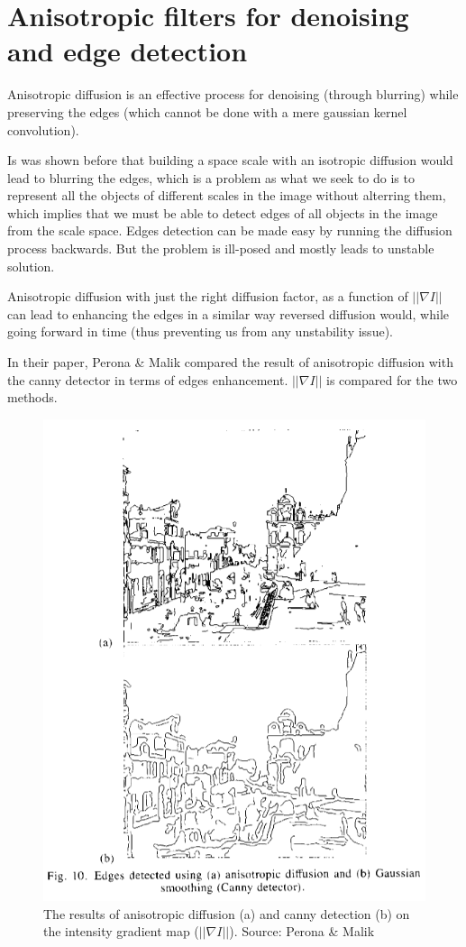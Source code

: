 \documentclass[12pt,a4paper]{article}
\begin{document}
\section{Anisotropic filters for denoising and edge detection}

Anisotropic diffusion is an effective process for denoising (through blurring) while preserving the edges (which cannot be done with a mere gaussian kernel convolution). 

Is was shown before that building a space scale with an isotropic diffusion would lead to blurring the edges, which is a problem as what we seek to do is to represent all the objects of different scales in the image without alterring them, which implies that we must be able to detect edges of all objects in the image from the scale space.
Edges detection can be made easy by running the diffusion process backwards. But the problem is ill-posed and mostly leads to unstable solution.

Anisotropic diffusion with just the right diffusion factor, as a function of $|| \nabla I||$ can lead to enhancing the edges in a similar way reversed diffusion would, while going forward in time (thus preventing us from any unstability issue).

In their paper, Perona \& Malik compared the result of anisotropic diffusion with the canny detector in terms of edges enhancement. $|| \nabla I ||$ is compared for the two methods.

\begin{figure}[h]
	\centering
	\includegraphics[scale=0.5]{EdgeEnhancement_Example.png}
	\caption{The results of anisotropic diffusion (a) and canny detection (b) on the intensity gradient map ($||\nabla I||$). Source: Perona \& Malik}	
\end{figure}
\end{document}
